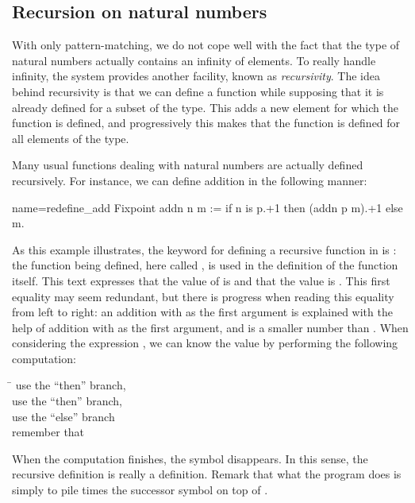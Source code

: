 
\subsection{Recursion on natural numbers}\label{ssec:recnat}


With only pattern-matching, we do not cope well with the fact that the
type  of natural numbers actually contains an infinity of
elements.  To really handle infinity, the \Coq{} system provides another
facility, known as {\em recursivity}.  The idea behind recursivity is
that we can define a function while supposing that it is already
defined for a subset of the type.  This adds a new element for which
the function is defined, and progressively this makes that the
function is defined for all elements of the type.

Many usual functions dealing with natural numbers are actually
defined recursively.  For instance, we can define addition in the
following manner:

\begin{coq}{name=redefine_add}{}
Fixpoint addn n m :=
  if n is p.+1 then (addn p m).+1 else m.
\end{coq}
As this example illustrates, the keyword for defining a recursive
function in \Coq{} is : the function being
defined, here called , is used in the definition of the
function  itself.  This text expresses that the value of
 is
 and that the value  is .
This first equality may
seem redundant, but there is progress when reading this equality from
left to right: an addition with  as the first argument
is explained with the help of addition with  as the first
argument, and  is a smaller number than .  When considering the
expression , we can know the value by performing the following
computation:
\begin{tabbing}
\=\kill
{} \> use the ``then'' branch, \\
 \> use the ``then'' branch, \\
 \> use the ``else'' branch\\
\> remember that 
\end{tabbing}
When the computation finishes, the symbol  disappears.  In
this sense, the recursive definition is really a definition.  Remark that
what the  program does is simply to pile  times the
successor symbol on top of .

